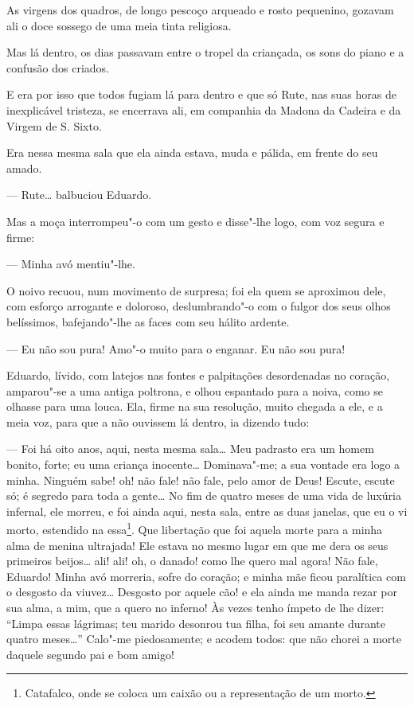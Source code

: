 As virgens dos quadros, de longo pescoço arqueado e rosto pequenino,
gozavam ali o doce sossego de uma meia tinta religiosa.

Mas lá dentro, os dias passavam entre o tropel da criançada, os sons do
piano e a confusão dos criados.

E era por isso que todos fugiam lá para dentro e que só Rute, nas suas
horas de inexplicável tristeza, se encerrava ali, em companhia da Madona
da Cadeira e da Virgem de S. Sixto.

Era nessa mesma sala que ela ainda estava, muda e pálida, em frente do
seu amado.

--- Rute\ldots{} balbuciou Eduardo.

Mas a moça interrompeu"-o com um gesto e disse"-lhe logo, com voz segura e
firme:

--- Minha avó mentiu"-lhe.

O noivo recuou, num movimento de surpresa; foi ela quem se aproximou
dele, com esforço arrogante e doloroso, deslumbrando"-o com o fulgor dos
seus olhos belíssimos, bafejando"-lhe as faces com seu hálito ardente.

--- Eu não sou pura! Amo"-o muito para o enganar. Eu não sou pura!

Eduardo, lívido, com latejos nas fontes e palpitações desordenadas no
coração, amparou"-se a uma antiga poltrona, e olhou espantado para a
noiva, como se olhasse para uma louca. Ela, firme na sua resolução,
muito chegada a ele, e a meia voz, para que a não ouvissem lá dentro, ia
dizendo tudo:

--- Foi há oito anos, aqui, nesta mesma sala\ldots{} Meu padrasto era um homem
bonito, forte; eu uma criança inocente\ldots{} Dominava"-me; a sua vontade era
logo a minha. Ninguém sabe! oh! não fale! não fale, pelo amor de Deus!
Escute, escute só; é segredo para toda a gente\ldots{} No fim de quatro meses
de uma vida de luxúria infernal, ele morreu, e foi ainda aqui, nesta
sala, entre as duas janelas, que eu o vi morto, estendido na
essa\footnote{Catafalco, onde se coloca um caixão ou a representação de
  um morto.}. Que libertação que foi aquela morte para a minha alma de
menina ultrajada! Ele estava no mesmo lugar em que me dera os seus
primeiros beijos\ldots{} ali! ali! oh, o danado! como lhe quero mal agora!
Não fale, Eduardo! Minha avó morreria, sofre do coração; e minha mãe
ficou paralítica com o desgosto da viuvez\ldots{} Desgosto por aquele cão! e
ela ainda me manda rezar por sua alma, a mim, que a quero no inferno! Às
vezes tenho ímpeto de lhe dizer: ``Limpa essas lágrimas; teu marido
desonrou tua filha, foi seu amante durante quatro meses\ldots{}'' Calo"-me
piedosamente; e acodem todos: que não chorei a morte daquele segundo pai
e bom amigo!

